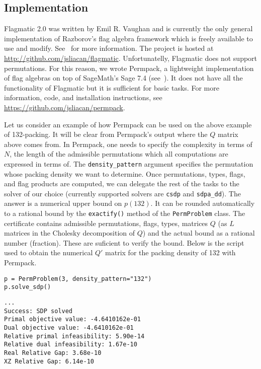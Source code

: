 \subsection{Implementation}
Flagmatic 2.0 was written by Emil R. Vaughan and is currently the only general implementation of Razborov's flag algebra framework which is freely available to use and modify. See~\cite{flagmatic} for more information. The project is hosted at \url{http://github.com/jsliacan/flagmatic}. Unfortunatelly, Flagmatic does not support permutations. For this reason, we wrote Permpack, a lightweight implementation of flag algebras on top of SageMath's Sage 7.4 (see~\cite{sagemath}). It does not have all the functionality of Flagmatic but it is sufficient for basic tasks. For more information, code, and installation instructions, see \url{https://github.com/jsliacan/permpack}. 

Let us consider an example of how Permpack can be used on the above example of 132-packing. It will be clear from Permpack's output where the $Q$ matrix above comes from. In Permpack, one needs to specify the complexity in terms of $N$, the length of the admissible permutations which all computations are expressed in terms of. The \texttt{density\_pattern} argument specifies the permutation whose packing density we want to determine. Once permutations, types, flags, and flag products are computed, we can delegate the rest of the tasks to the solver of our choice (currently supported solvers are \texttt{csdp} and \texttt{sdpa\_dd}). The answer is a numerical upper bound on $p(132)$. It can be rounded automatically to a rational bound by the \texttt{exactify()} method of the \texttt{PermProblem} class. The certificate contains admissible permutations, flags, types, matrices $Q$ (as $L$ matrices in the Cholesky decomposition of $Q$) and the actual bound as a rational number (fraction). These are suficient to verify the bound. Below is the script used to obtain the numerical $Q'$ matrix for the packing density of 132 with Permpack.

\begin{lstlisting}
p = PermProblem(3, density_pattern="132")
p.solve_sdp()
\end{lstlisting}
\begin{lstlisting}
...
Success: SDP solved
Primal objective value: -4.6410162e-01 
Dual objective value: -4.6410162e-01 
Relative primal infeasibility: 5.90e-14 
Relative dual infeasibility: 1.67e-10 
Real Relative Gap: 3.68e-10 
XZ Relative Gap: 6.14e-10 
\end{lstlisting}

